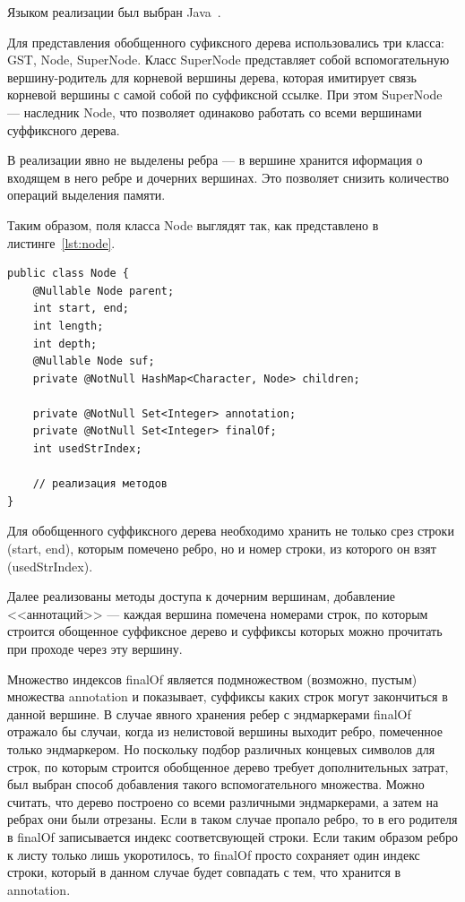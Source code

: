 \documentclass[14pt, russian]{scrartcl}
\begin{document}
Языком реализации был выбран Java~\cite{java}.  
 
Для представления обобщенного суфиксного дерева использовались три класса: GST, Node, SuperNode. Класс SuperNode представляет собой вспомогательную вершину-родитель для корневой вершины дерева, которая имитирует связь корневой вершины с самой собой по суффиксной ссылке. При этом SuperNode ---  наследник Node, что позволяет одинаково работать 
со всеми вершинами суффиксного дерева.

В реализации явно не выделены ребра --- в вершине хранится иформация о входящем в него ребре и дочерних вершинах.
Это позволяет снизить количество операций выделения памяти.

Таким образом, поля класса Node выглядят так, как представлено в листинге~\ref{lst:node}.

\begin{listing}[htb!]
\caption{Класс представления вершины}
\label{lst:node}
\begin{verbatim}
public class Node {
    @Nullable Node parent;
    int start, end;
    int length;
    int depth;
    @Nullable Node suf;
    private @NotNull HashMap<Character, Node> children;

    private @NotNull Set<Integer> annotation;
    private @NotNull Set<Integer> finalOf;
    int usedStrIndex;
    
    // реализация методов
}
\end{verbatim}
\end{listing}

Для обобщенного суффиксного дерева необходимо хранить не только срез строки (start, end), которым помечено ребро, но 
и номер строки, из которого он взят (usedStrIndex).

Далее реализованы методы доступа к дочерним вершинам, добавление <<аннотаций>> --- каждая вершина помечена номерами строк, по которым строится обощенное суффиксное дерево и суффиксы которых можно прочитать при проходе через эту вершину. 

Множество индексов finalOf является подмножеством (возможно, пустым) множества annotation и показывает, суффиксы каких строк могут закончиться в данной вершине. В случае явного хранения ребер с эндмаркерами finalOf отражало бы случаи, когда из нелистовой вершины выходит ребро, помеченное только эндмаркером.
Но поскольку подбор различных концевых символов для строк, по которым строится обобщенное дерево требует дополнительных затрат, был выбран способ добавления такого вспомогательного множества. Можно считать, что дерево построено со всеми различными эндмаркерами, а затем на ребрах они были отрезаны. Если в таком случае пропало ребро, то в его родителя в finalOf записывается индекс соответсвующей строки. Если таким образом ребро к листу только лишь укоротилось, то finalOf просто сохраняет один индекс строки, который в данном случае будет совпадать с тем, что хранится в annotation.  
\end{document}
